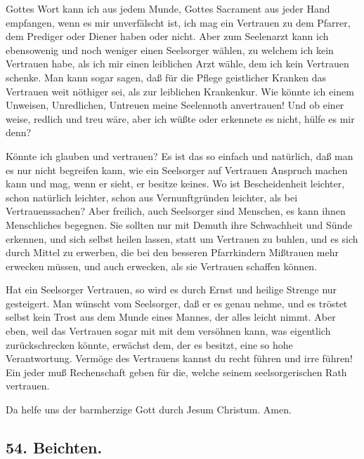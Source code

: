 Gottes Wort kann ich aus jedem Munde, Gottes Sacrament aus jeder Hand empfangen, wenn es mir unverfälscht ist, ich mag ein Vertrauen zu dem Pfarrer, dem Prediger oder Diener haben oder nicht. Aber zum Seelenarzt kann ich ebensowenig und noch weniger einen Seelsorger wählen, zu welchem ich kein Vertrauen habe, als ich mir einen leiblichen Arzt wähle, dem ich kein Vertrauen schenke. Man kann sogar sagen, daß für die Pflege geistlicher Kranken das Vertrauen weit nöthiger sei, als zur leiblichen Krankenkur. Wie könnte ich einem Unweisen, Unredlichen, Untreuen meine Seelennoth anvertrauen! Und ob einer weise, redlich und treu wäre, aber ich wüßte oder erkennete es nicht, hülfe es mir denn?

Könnte ich glauben und vertrauen? Es ist das so einfach und natürlich, daß man es nur nicht begreifen kann, wie ein Seelsorger auf Vertrauen Anspruch machen kann und mag, wenn er sieht, er besitze keines. Wo ist Bescheidenheit leichter, schon natürlich leichter, schon aus Vernunftgründen leichter, als bei Vertrauenssachen? Aber freilich, auch Seelsorger sind Menschen, es kann ihnen Menschliches begegnen. Sie sollten nur mit Demuth ihre Schwachheit und Sünde erkennen, und sich selbst heilen lassen, statt um Vertrauen zu buhlen, und es sich durch Mittel zu erwerben, die bei den besseren Pfarrkindern Mißtrauen mehr erwecken müssen, und auch erwecken, als sie Vertrauen schaffen können.

Hat ein Seelsorger Vertrauen, so wird es durch Ernst und heilige Strenge nur gesteigert. Man wünscht vom Seelsorger, daß er es genau nehme, und es tröstet selbst kein Trost aus dem Munde eines Mannes, der alles leicht nimmt. Aber eben, weil das Vertrauen sogar mit mit dem versöhnen kann, was eigentlich zurückschrecken könnte, erwächst dem, der es besitzt, eine so hohe Verantwortung. Vermöge des Vertrauens kannst du recht führen und irre führen! Ein jeder muß Rechenschaft geben für die, welche seinem seelsorgerischen Rath vertrauen.

Da helfe uns der barmherzige Gott durch Jesum Christum. Amen.

\subsection*{54. Beichten.}

